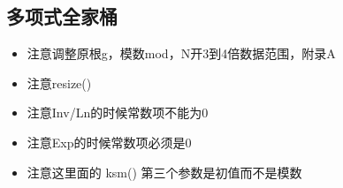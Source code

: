 \subsection{多项式全家桶}
\begin{itemize}
    \item 注意调整原根g，模数mod，N开3到4倍数据范围，附录A
    \item 注意resize()
    \item 注意Inv/Ln的时候常数项不能为0
    \item 注意Exp的时候常数项必须是0
    \item 注意这里面的 ksm() 第三个参数是初值而不是模数
\end{itemize}


